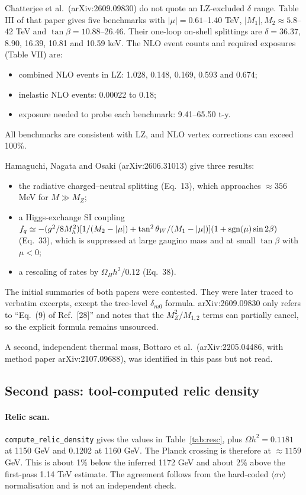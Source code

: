 \documentclass[11pt,a4paper]{article}
\begin{document}
Chatterjee et al.\ (arXiv:2609.09830) do not quote an LZ-excluded $\delta$ range. Table III of that paper gives five benchmarks with $|\mu|=0.61$--1.40 TeV, $|M_1|,M_2\approx5.8$--42 TeV and $\tan\beta=10.88$--26.46. Their one-loop on-shell splittings are $\delta=36.37$, 8.90, 16.39, 10.81 and 10.59 keV. The NLO event counts and required exposures (Table VII) are:
\begin{itemize}
\item combined NLO events in LZ: 1.028, 0.148, 0.169, 0.593 and 0.674;
\item inelastic NLO events: 0.00022 to 0.18;
\item exposure needed to probe each benchmark: 9.41--65.50 t-y.
\end{itemize}
All benchmarks are consistent with LZ, and NLO vertex corrections can exceed 100\%.

Hamaguchi, Nagata and Osaki (arXiv:2606.31013) give three results:
\begin{itemize}
\item the radiative charged--neutral splitting (Eq.~13), which approaches $\approx356$ MeV for $M\gg M_Z$;
\item a Higgs-exchange SI coupling $f_q\simeq-(g^2/8M_h^2)[1/(M_2-|\mu|)+\tan^2\theta_W/(M_1-|\mu|)](1+{\rm sgn}(\mu)\sin2\beta)$ (Eq.~33), which is suppressed at large gaugino mass and at small $\tan\beta$ with $\mu<0$;
\item a rescaling of rates by $\Omega_Hh^2/0.12$ (Eq.~38).
\end{itemize}
The initial summaries of both papers were contested. They were later traced to verbatim excerpts, except the tree-level $\delta_{m0}$ formula. arXiv:2609.09830 only refers to ``Eq.~(9) of Ref.~[28]'' and notes that the $M_Z^2/M_{1,2}$ terms can partially cancel, so the explicit formula remains unsourced.

A second, independent thermal mass, Bottaro et al.\ (arXiv:2205.04486, with method paper arXiv:2107.09688), was identified in this pass but not read.

\subsection{Second pass: tool-computed relic density}

\paragraph{Relic scan.} \texttt{compute\_relic\_density} gives the values in Table~\ref{tab:resc}, plus $\Omega h^2=0.1181$ at 1150 GeV and 0.1202 at 1160 GeV. The Planck crossing is therefore at $\approx1159$ GeV. This is about 1\% below the inferred 1172 GeV and about 2\% above the first-pass 1.14 TeV estimate. The agreement follows from the hard-coded $\langle\sigma v\rangle$ normalisation and is not an independent check.
\end{document}
